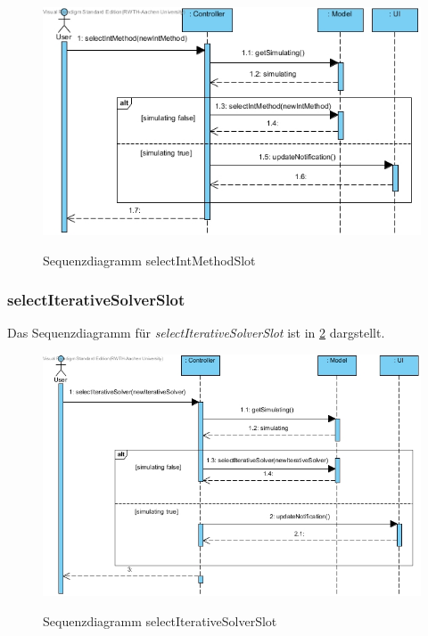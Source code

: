 \begin{figure}[H]
	\centering
	\includegraphics[scale=.6]{Bilder/Controller__selectIntMethodSlot().jpg}\\
	\caption{Sequenzdiagramm selectIntMethodSlot}
	\label{Sequenzdiagramm selectIntMethodSlot}
\end{figure}

\subsubsection*{selectIterativeSolverSlot}

Das Sequenzdiagramm für \emph{selectIterativeSolverSlot} ist in \ref{Sequenzdiagramm selectIterativeSolverSlot} dargstellt.

\begin{figure}[H]
	\centering
	\includegraphics[scale=.6]{Bilder/Controller__selectIterativeSolverSlot().jpg}\\
	\caption{Sequenzdiagramm selectIterativeSolverSlot}
	\label{Sequenzdiagramm selectIterativeSolverSlot}
\end{figure}

